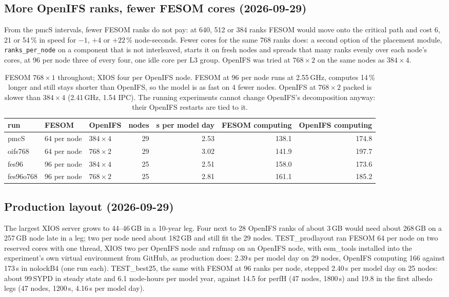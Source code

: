 \documentclass[11pt,a4paper]{article}
\begin{document}
\subsection{More OpenIFS ranks, fewer FESOM cores (2026-09-29)}
From the pmcS intervals, fewer FESOM ranks do not pay: at 640, 512 or 384 ranks FESOM would move onto the critical path and cost 6, 21 or 54\,\% in speed for $-1$, $+4$ or $+22$\,\% node-seconds. Fewer cores for the same 768 ranks does: a second option of the placement module, \texttt{ranks\_per\_node} on a component that is not interleaved, starts it on fresh nodes and spreads that many ranks evenly over each node's cores, at 96 per node three of every four, one idle core per L3 group. OpenIFS was tried at $768\times2$ on the same nodes as $384\times4$.
\begin{table}[H]\centering\footnotesize\setlength{\tabcolsep}{4pt}
\begin{tabular}{lllrrrr}\toprule
run & FESOM & OpenIFS & nodes & s per model day & FESOM computing & OpenIFS computing\\\midrule
pmcS & 64 per node & $384\times4$ & 29 & 2.53 & 138.1 & 174.8\\
oifs768 & 64 per node & $768\times2$ & 29 & 3.02 & 141.9 & 197.7\\
fes96 & 96 per node & $384\times4$ & 25 & 2.51 & 158.0 & 173.6\\
fes96o768 & 96 per node & $768\times2$ & 25 & 2.81 & 161.1 & 185.2\\\bottomrule
\end{tabular}
\caption{FESOM $768\times1$ throughout; XIOS four per OpenIFS node. FESOM at 96 per node runs at 2.55\,GHz, computes 14\,\% longer and still stays shorter than OpenIFS, so the model is as fast on 4 fewer nodes. OpenIFS at $768\times2$ packed is slower than $384\times4$ (2.41\,GHz, 1.54 IPC). The running experiments cannot change OpenIFS's decomposition anyway: their OpenIFS restarts are tied to it.}\label{tab:fes96}
\end{table}

\subsection{Production layout (2026-09-29)}
The largest XIOS server grows to 44--46\,GB in a 10-year leg. Four next to 28 OpenIFS ranks of about 3\,GB would need about 268\,GB on a 257\,GB node late in a leg; two per node need about 182\,GB and still fit the 29 nodes. TEST\_prodlayout ran FESOM 64 per node on two reserved cores with one thread, XIOS two per OpenIFS node and rnfmap on an OpenIFS node, with esm\_tools installed into the experiment's own virtual environment from GitHub, as production does: 2.39\,s per model day on 29 nodes, OpenIFS computing 166 against 173\,s in nolockB4 (one run each). TEST\_best25, the same with FESOM at 96 ranks per node, stepped 2.40\,s per model day on 25 nodes: about 99\,SYPD in steady state and 6.1 node-hours per model year, against 14.5 for perfH (47 nodes, 1800\,s) and 19.8 in the first albedo legs (47 nodes, 1200\,s, 4.16\,s per model day).
\end{document}
